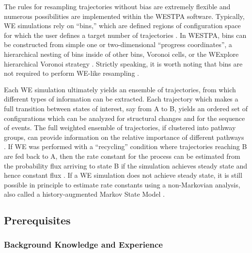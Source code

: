 \documentclass[9pt,tutorial,pubversion]{livecoms}
\begin{document}
The rules for resampling trajectories without bias are extremely flexible \citep{Zhang2010} and numerous possibilities are implemented within the WESTPA software. 
Typically, WE simulations rely on “bins,” which are defined regions of configuration space for which the user defines a target number of trajectories \citep{HuberKim1996}. 
In WESTPA, bins can be constructed from simple one or two-dimensional “progress coordinates”, a hierarchical nesting of bins inside of other bins, Voronoi cells, or the WExplore hierarchical Voronoi strategy \citep{Zwier2015,Dickson2014}.
Strictly speaking, it is worth noting that bins are not required to perform WE-like resampling \citep{Dickson2018or19}.

Each WE simulation ultimately yields an ensemble of trajectories, from which different types of information can be extracted. 
Each trajectory which makes a full transition between states of interest, say from A to B, yields an ordered set of configurations which can be analyzed for structural changes and for the sequence of events. 
The full weighted ensemble of trajectories, if clustered into pathway groups, can provide information on the relative importance of different pathways \citep{Ernesto2019}. 
If WE was performed with a “recycling” condition where trajectories reaching B are fed back to A, then the rate constant for the process can be estimated from the probability flux arriving to state B if the simulation achieves steady state and hence constant flux \citep{Divesh2010,ZuckermanChong2017}.
If a WE simulation does not achieve steady state, it is still possible in principle to estimate rate constants using a non-Markovian analysis, also called a history-augmented Markov State Model \cite{Ernesto2014,Upendra2019,Jeremy2019}.

\subsection{Prerequisites}

\subsubsection{Background Knowledge and Experience}
\end{document}
